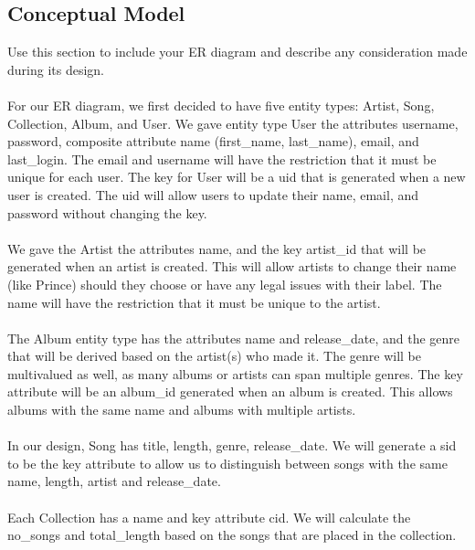 \documentclass[12pt]{article}
\begin{document}
    \subsection{Conceptual Model}
    Use this section to include your ER diagram and describe any consideration made during its design.
    \\~\\
    For our ER diagram, we first decided to have five entity types:
    Artist, Song, Collection, Album, and User. We gave entity type User the attributes
    username, password, composite attribute name (first\_name, last\_name), email, and
    last\_login. The email and username will have the restriction that it must be unique
    for each user. The key for User will be a uid that is generated when a new user is
    created. The uid will allow users to update their name, email, and password without
    changing the key.
    \\~\\
    We gave the Artist the attributes name, and the key artist\_id that
    will be generated when an artist is created. This will allow artists to change their
    name (like Prince) should they choose or have any legal issues with their label. The
    name will have the restriction that it must be unique to the artist.
    \\~\\
    The Album entity type has the attributes name and release\_date, and the
    genre that will be derived based on the artist(s) who made it. The genre will be
    multivalued as well, as many albums or artists can span multiple genres. The key
    attribute will be an album\_id generated when an album is created. This allows albums
    with the same name and albums with multiple artists.
    \\~\\
    In our design, Song has title, length, genre, release\_date. We will
    generate a sid to be the key attribute to allow us to distinguish between songs with
    the same name, length, artist and release\_date.
    \\~\\
    Each Collection has a name and key attribute cid. We will calculate
    the no\_songs and total\_length based on the songs that are placed in the collection.
\end{document}
